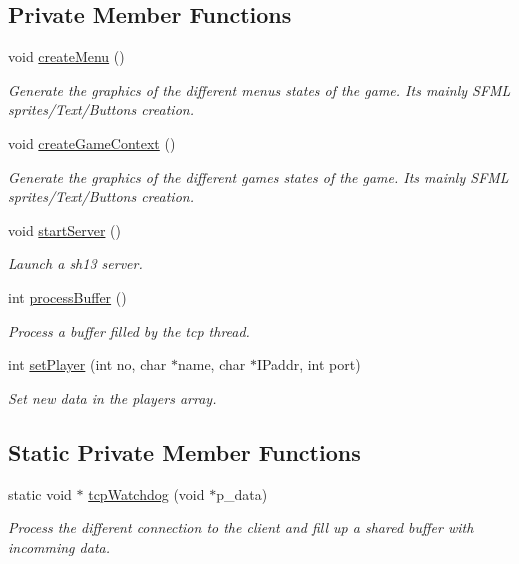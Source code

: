 \subsection*{Private Member Functions}
\begin{DoxyCompactItemize}
\item 
void \hyperlink{class_game_a3bce2a9f8f79bd9ce6878a1afd51994d}{create\+Menu} ()
\begin{DoxyCompactList}\small\item\em Generate the graphics of the different menu\textquotesingle{}s states of the game. It\textquotesingle{}s mainly S\+F\+ML sprites/\+Text/\+Buttons creation. \end{DoxyCompactList}\item 
void \hyperlink{class_game_a4e497a8b5bf1e585a66324f4884f055b}{create\+Game\+Context} ()
\begin{DoxyCompactList}\small\item\em Generate the graphics of the different game\textquotesingle{}s states of the game. It\textquotesingle{}s mainly S\+F\+ML sprites/\+Text/\+Buttons creation. \end{DoxyCompactList}\item 
void \hyperlink{class_game_aed51d3d3760d9c052cdf33144ead0fba}{start\+Server} ()
\begin{DoxyCompactList}\small\item\em Launch a sh13 server. \end{DoxyCompactList}\item 
int \hyperlink{class_game_a087cbce66aa1586d8da688c67755c641}{process\+Buffer} ()
\begin{DoxyCompactList}\small\item\em Process a buffer filled by the tcp thread. \end{DoxyCompactList}\item 
int \hyperlink{class_game_a4cbb03c1c0cd47feb713ba9883654ab3}{set\+Player} (int no, char $\ast$name, char $\ast$I\+Paddr, int port)
\begin{DoxyCompactList}\small\item\em Set new data in the players array. \end{DoxyCompactList}\end{DoxyCompactItemize}
\subsection*{Static Private Member Functions}
\begin{DoxyCompactItemize}
\item 
static void $\ast$ \hyperlink{class_game_a1de7811d3b61dcf66cc4371200b3f64a}{tcp\+Watchdog} (void $\ast$p\+\_\+data)
\begin{DoxyCompactList}\small\item\em Process the different connection to the client and fill up a shared buffer with incomming data. \end{DoxyCompactList}\end{DoxyCompactItemize}
